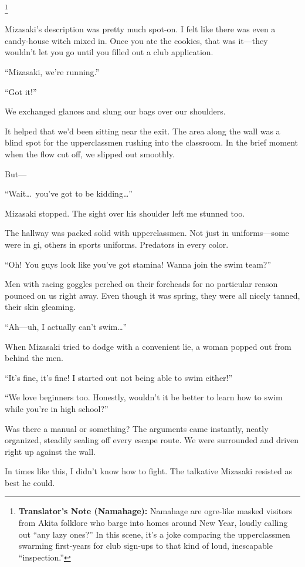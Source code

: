 \documentclass[
    a4paper,
    12pt,
    twoside,
    openany,
    UTF8,
    fontset=windows
]{ctexbook}
\begin{document}
\footnote{\textbf{Translator's Note (Namahage):} Namahage are ogre-like masked visitors from Akita folklore who barge into homes around New Year, loudly calling out ``any lazy ones?'' In this scene, it's a joke comparing the upperclassmen swarming first-years for club sign-ups to that kind of loud, inescapable ``inspection.''}

Mizasaki's description was pretty much spot-on. I felt like there was even a candy-house witch mixed in. Once you ate the cookies, that was it---they wouldn't let you go until you filled out a club application.

``Mizasaki, we're running.''

``Got it!''

We exchanged glances and slung our bags over our shoulders.

It helped that we'd been sitting near the exit. The area along the wall was a blind spot for the upperclassmen rushing into the classroom. In the brief moment when the flow cut off, we slipped out smoothly.

But---

``Wait\dots\ you've got to be kidding\dots''

Mizasaki stopped. The sight over his shoulder left me stunned too.

The hallway was packed solid with upperclassmen. Not just in uniforms---some were in gi, others in sports uniforms. Predators in every color.

``Oh! You guys look like you've got stamina! Wanna join the swim team?''

Men with racing goggles perched on their foreheads for no particular reason pounced on us right away. Even though it was spring, they were all nicely tanned, their skin gleaming.

``Ah---uh, I actually can't swim\dots''

When Mizasaki tried to dodge with a convenient lie, a woman popped out from behind the men.

``It's fine, it's fine! I started out not being able to swim either!''

``We love beginners too. Honestly, wouldn't it be better to learn how to swim while you're in high school?''

Was there a manual or something? The arguments came instantly, neatly organized, steadily sealing off every escape route. We were surrounded and driven right up against the wall.

In times like this, I didn't know how to fight. The talkative Mizasaki resisted as best he could.
\end{document}
